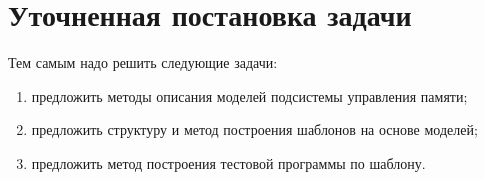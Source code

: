 \documentclass[14pt]{extreport}
\begin{document}
%
%


\section{Уточненная постановка задачи}

Тем самым надо решить следующие задачи:
\begin{enumerate}
	\item предложить методы описания моделей подсистемы управления памяти;
	\item предложить структуру и метод построения шаблонов на основе моделей;
	\item предложить метод построения тестовой программы по шаблону.
\end{enumerate}









\pagebreak
\appendix
% 

\pagebreak





\end{document}
